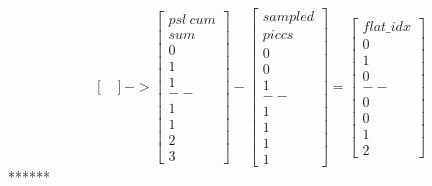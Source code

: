 \documentclass[,table,dvipsnames]{article}
\begin{document}
\[\begin{bmatrix}
\end{bmatrix}
->
\begin{bmatrix}
psl\ cum\\sum  \\ 0 \\ 1 \\1 \\-- \\ 1 \\ 1 \\ 2 \\ 3
\end{bmatrix}
-
\begin{bmatrix}
sampled\\ piccs\\0\\0\\1\\--\\1\\1\\1\\1
\end{bmatrix}
=
\begin{bmatrix}
flat\_idx  \\ 0 \\ 1 \\0 \\-- \\ 0 \\ 0 \\ 1\\ 2
\end{bmatrix}
\]
******
\end{document}
